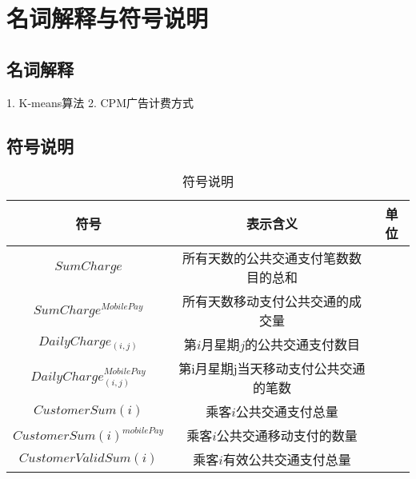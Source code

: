 \documentclass[withoutpreface,bwprint]{cumcmthesis} %
\begin{document}
\section{名词解释与符号说明}
\subsection{名词解释}
1. K-means算法
2. CPM广告计费方式
\subsection{符号说明}
\begin{center}
\makeatletter{}\makeatother
\begin{table}[htbp]
\centering
\caption{符号说明}\label{tab:aStrangeTable}\centering%
\begin{tabular}{c|c|c}\hline
符号& 表示含义& 单位\\\hline
$SumCharge$ & 所有天数的公共交通支付笔数数目的总和 & \\
$SumCharge^{MobilePay}$ & 所有天数移动支付公共交通的成交量 & \\
$DailyCharge_{(i,j)}$&第$i$月星期$j$的公共交通支付数目&\\
$DailyCharge^{MobilePay}_{(i,j)}$&第i月星期j当天移动支付公共交通的笔数&\\
$CustomerSum(i)$&乘客$i$公共交通支付总量&\\
$CustomerSum(i)^{mobilePay}$&乘客$i$公共交通移动支付的数量&\\
$CustomerValidSum(i)$&乘客$i$有效公共交通支付总量&\\

\end{tabular}
\end{table}
\end{center}
\end{document}
